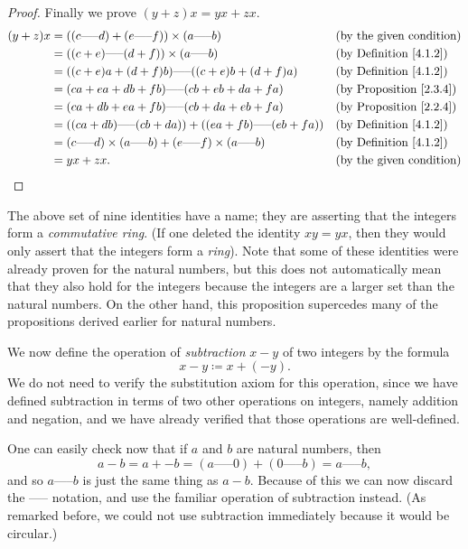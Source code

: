 \begin{proof}
Finally we prove \((y + z)x = yx + zx\).
\begin{align*}
(y + z)x &= ((c \text{-----} d) + (e \text{-----} f)) \times (a \text{-----} b) && \text{(by the given condition)} \\
&= ((c + e) \text{-----} (d + f)) \times (a \text{-----} b) && \text{(by Definition \ref{4.1.2})} \\
&= ((c + e)a + (d + f)b) \text{-----} ((c + e)b + (d + f)a) && \text{(by Definition \ref{4.1.2})} \\
&= (ca + ea + db + fb) \text{-----} (cb + eb + da + fa) && \text{(by Proposition \ref{2.3.4})} \\
&= (ca + db + ea + fb) \text{-----} (cb + da + eb + fa) && \text{(by Proposition \ref{2.2.4})} \\
&= ((ca + db) \text{-----} (cb + da)) + ((ea + fb) \text{-----} (eb + fa)) && \text{(by Definition \ref{4.1.2})} \\
&= (c \text{-----} d) \times (a \text{-----} b) + (e \text{-----} f) \times (a \text{-----} b) && \text{(by Definition \ref{4.1.2})} \\
&= yx + zx. && \text{(by the given condition)}
\end{align*}
\end{proof}

\begin{remark}\label{4.1.7}
The above set of nine identities have a name; they are asserting that the integers form a \emph{commutative ring}.
(If one deleted the identity \(xy = yx\), then they would only assert that the integers form a \emph{ring}).
Note that some of these identities were already proven for the natural numbers, but this does not automatically mean that they also hold for the integers because the integers are a larger set than the natural numbers.
On the other hand, this proposition supercedes many of the propositions derived earlier for natural numbers.
\end{remark}

\begin{note}
We now define the operation of \emph{subtraction} \(x - y\) of two integers by the formula
\[
    x - y \coloneqq x + (-y).
\]
We do not need to verify the substitution axiom for this operation, since we have defined subtraction in terms of two other operations on integers, namely addition and negation, and we have already verified that those operations are well-defined.
\end{note}

\begin{note}
One can easily check now that if \(a\) and \(b\) are natural numbers, then
\[
    a - b = a + -b = (a \text{-----} 0) + (0 \text{-----} b) = a \text{-----} b,
\]
and so \(a \text{-----} b\) is just the same thing as \(a - b\).
Because of this we can now discard the ----- notation, and use the familiar operation of subtraction instead.
(As remarked before, we could not use subtraction immediately because it would be circular.)
\end{note}

